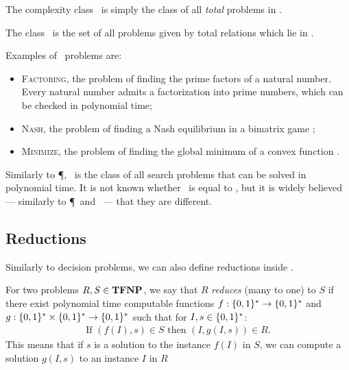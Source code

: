 The complexity class \TFNP\ is simply the class of all \emph{total} problems in \FNP.

\begin{definition}
	The class \TFNP\ is the set of all problems given by total relations which lie in \FNP.
\end{definition}

Examples of \TFNP\ problems are:
\begin{itemize}
	\item \textsc{Factoring}, the problem of finding the prime factors of a natural number. Every natural number admits a factorization into prime numbers, which can be checked in polynomial time;
	\item \textsc{Nash}, the problem of finding a Nash equilibrium in a bimatrix game ;
	\item \textsc{Minimize}, the problem of finding the global minimum of a convex function .
\end{itemize}
Similarly to \P, \FP\ is the class of all search problems that can be solved in polynomial time. It is not known whether \FP\ is equal to \TFNP, but it is widely believed --- similarly to \P\ and \NP\ --- that they are different.

\subsection{Reductions}

Similarly to decision problems, we can also define reductions inside \TFNP.

\begin{definition}
	For two problems $R, S \in \textbf{TFNP}$, we say that $R$ \emph{reduces} (many to one) to $S$ if there exist polynomial time computable functions $f : \{0, 1\}^* \rightarrow \{0, 1\}^*$ and $g : \{0, 1\}^* \times \{0, 1\}^* \rightarrow \{0, 1\}^*$ such that for $I, s \in \{0, 1\}^*$:
	\begin{align*}
		\text{If } (f(I), s) \in S \text{ then } (I, g(I, s)) \in R.
	\end{align*}
	This means that if $s$ is a solution to the instance $f(I)$ in $S$, we can compute a solution $g(I, s)$ to an instance $I$ in $R$
\end{definition}

